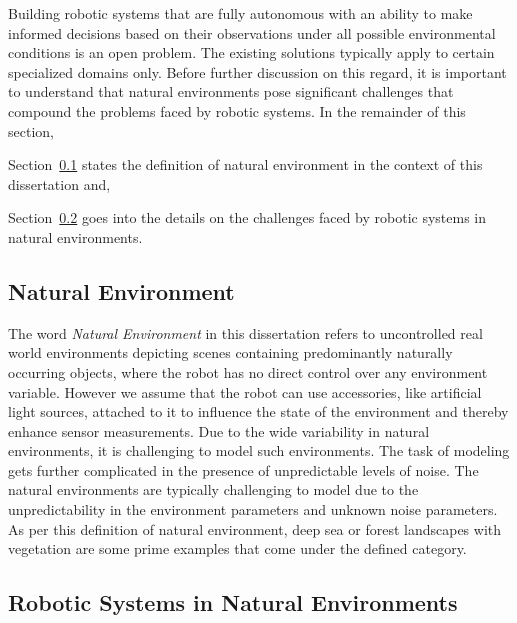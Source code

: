 \documentclass {udthesis}
\begin{document}
Building robotic systems that are fully autonomous with an ability to make informed decisions based on their observations under all possible environmental conditions is an open problem.
The existing solutions typically apply to certain specialized domains only. 
Before further discussion on this regard, it is important to
understand that natural environments pose significant challenges that compound the problems faced by robotic systems.
In the remainder of this section, \begin{enumerate*}[label=(\roman*)] \item Section~\ref{sec:nat_environ_def} states the definition of natural environment in the context of this dissertation and, \item Section~\ref{sec:robots_nat_environ} goes into the details on the challenges faced by robotic systems in natural environments. \end{enumerate*}


\subsection{Natural Environment}
\label{sec:nat_environ_def}

The word \emph{Natural Environment} in this dissertation refers to uncontrolled real world environments depicting scenes containing predominantly naturally occurring objects, where the robot has 
no direct control over any environment variable. However we assume that the robot can use accessories, like artificial light sources, attached to it to influence the state of the environment and thereby enhance sensor measurements. 
Due to the wide variability in natural environments, 
it is challenging to model such environments.
The task of modeling gets further complicated in the presence of unpredictable levels of noise. The natural environments are typically challenging to model due to the unpredictability in the environment parameters and unknown noise parameters. 
As per this definition of natural environment, deep sea or forest landscapes with vegetation are some prime examples that come under the defined category.


\subsection{Robotic Systems in Natural Environments}
\label{sec:robots_nat_environ}
\end{document}
